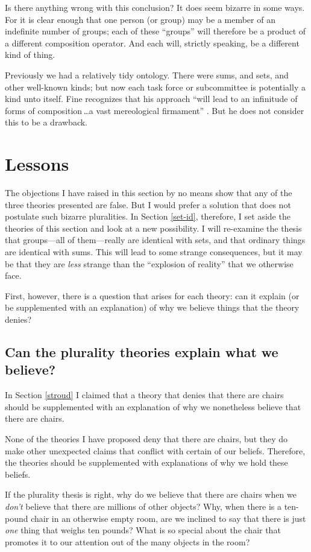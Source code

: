 \documentclass[12pt,twoside]{reedfancy}
\begin{document}
\begin{spacing}{1.25}
Is there anything wrong with this conclusion?  It does seem bizarre in
some ways.  For it is clear enough that one person (or group) may be a
member of an indefinite number of groups; each of these ``groups''
will therefore be a product of a different composition operator.  And
each will, strictly speaking, be a different kind of thing.

Previously we had a relatively tidy ontology.  There were sums, and
sets, and other well-known kinds; but now each task force or
subcommittee is potentially a kind unto itself.  Fine recognizes that
his approach ``will lead to an infinitude of forms of
composition\,\ldots a vast mereological firmament''
\citeyearpar[576]{fine2010}.  But he does not consider this to be a
drawback.

\section{Lessons}
\label{lessons-p}
The objections I have raised in this section by no means show that any
of the three theories presented are false.  But I would prefer a
solution that does not postulate such bizarre pluralities.  In Section
\ref{set-id}, therefore, I set aside the theories of this section and
look at a new possibility.  I will re-examine the thesis that
groups---all of them---really are identical with sets, and that
ordinary things are identical with sums.  This will lead to some
strange consequences, but it may be that they are {\em less} strange
than the ``explosion of reality'' that we otherwise face.

First, however, there is a question that arises for each theory: can
it explain (or be supplemented with an explanation) of why we believe
things that the theory denies?

\subsection{Can the plurality theories explain what we believe?}
\label{explain-p}
In Section \ref{stroud} I claimed that a theory that denies that there
are chairs should be supplemented with an explanation of why we
nonetheless believe that there are chairs.

None of the theories I have proposed deny that there are chairs, but
they do make other unexpected claims that conflict with certain of our
beliefs.  Therefore, the theories should be supplemented with
explanations of why we hold these beliefs.

If the plurality thesis is right, why do we believe that there are
chairs when we {\em don't} believe that there are millions of other
objects?  Why, when there is a ten-pound chair in an otherwise empty
room, are we inclined to say that there is just {\em one} thing that
weighs ten pounds?  What is so special about the chair that promotes
it to our attention out of the many objects in the room?


\end{spacing}
\end{document}
